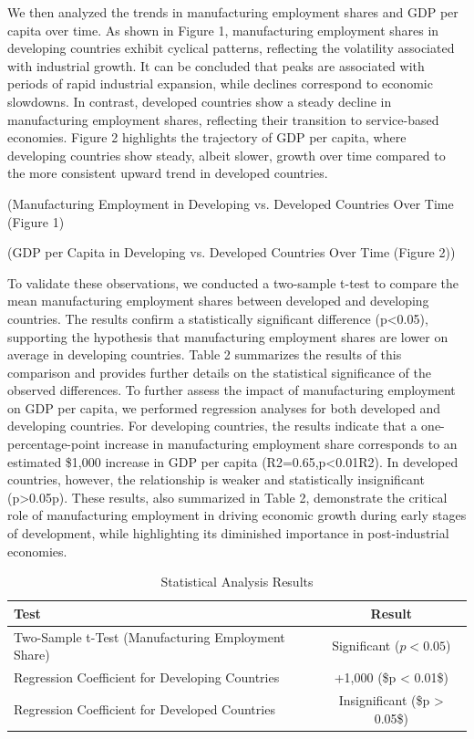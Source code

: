 \documentclass[12pt]{article}
\begin{document}
    We then analyzed the trends in manufacturing employment shares and GDP per capita over time. As shown in Figure 1, manufacturing employment shares in developing countries exhibit cyclical patterns, reflecting the volatility associated with industrial growth. It can be concluded that peaks are associated with periods of rapid industrial expansion, while declines correspond to economic slowdowns. In contrast, developed countries show a steady decline in manufacturing employment shares, reflecting their transition to service-based economies. Figure 2 highlights the trajectory of GDP per capita, where developing countries show steady, albeit slower, growth over time compared to the more consistent upward trend in developed countries.

(Manufacturing Employment in Developing vs. Developed Countries Over Time  (Figure 1)

(GDP per Capita in Developing vs. Developed Countries Over Time (Figure 2))

    To validate these observations, we conducted a two-sample t-test to compare the mean manufacturing employment shares between developed and developing countries. The results confirm a statistically significant difference (p<0.05), supporting the hypothesis that manufacturing employment shares are lower on average in developing countries. Table 2 summarizes the results of this comparison and provides further details on the statistical significance of the observed differences. 
    To further assess the impact of manufacturing employment on GDP per capita, we performed regression analyses for both developed and developing countries. For developing countries, the results indicate that a one-percentage-point increase in manufacturing employment share corresponds to an estimated \$1,000 increase in GDP per capita (R2=0.65,p<0.01R2). In developed countries, however, the relationship is weaker and statistically insignificant (p>0.05p). These results, also summarized in Table 2, demonstrate the critical role of manufacturing employment in driving economic growth during early stages of development, while highlighting its diminished importance in post-industrial economies.
\begin{table}[h!]
\centering
\caption{Statistical Analysis Results}
\begin{tabular}{|l|c|}
\hline
\textbf{Test} & \textbf{Result} \\ \hline
Two-Sample t-Test (Manufacturing Employment Share) & Significant ($p < 0.05$) \\ \hline
Regression Coefficient for Developing Countries & +1,000 (\$p < 0.01\$) \\ \hline
Regression Coefficient for Developed Countries & Insignificant (\$p > 0.05\$) \\ \hline
\end{tabular}
\label{table 2}
\end{table}
   
\end{document}
